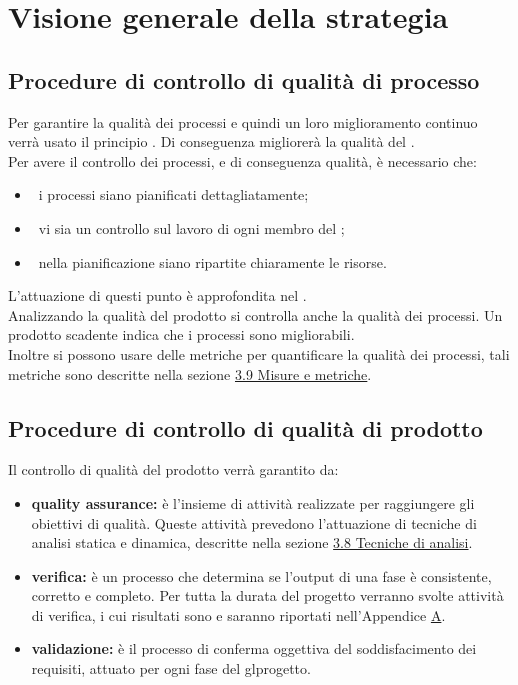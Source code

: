 
\section{Visione generale della strategia}
	\subsection{Procedure di controllo di qualità di processo}
		Per garantire la qualità dei processi e quindi un loro miglioramento continuo verrà usato il principio . Di conseguenza migliorerà la qualità del . \\
		Per avere il controllo dei processi, e di conseguenza qualità, è necessario che:
		\begin{itemize}
			\item\ i processi siano pianificati dettagliatamente;
			\item\ vi sia un controllo sul lavoro di ogni membro del ;
			\item\ nella pianificazione siano ripartite chiaramente le risorse.
		\end{itemize}
		L'attuazione di questi punto è approfondita nel \PPdoc. \\
		Analizzando la qualità del prodotto si controlla anche la qualità dei processi. Un prodotto scadente indica che i processi sono migliorabili. \\
		Inoltre si possono usare delle metriche per quantificare la qualità dei processi, tali metriche sono descritte nella sezione \hyperref[sec:MisureGenerale]{3.9 Misure e metriche}.
	\subsection{Procedure di controllo di qualità di prodotto}
		Il controllo di qualità del prodotto verrà garantito da:
		\begin{itemize}
			\item \textbf{quality assurance:} è l'insieme di attività realizzate per raggiungere gli obiettivi di qualità. Queste attività prevedono l'attuazione di tecniche di analisi statica e dinamica, descritte nella sezione \hyperref[sec:TecnicheAnalisi]{3.8 Tecniche di analisi}.
			\item \textbf{verifica:} è un processo che determina se l'output di una fase è consistente, corretto e completo. Per tutta la durata del progetto verranno svolte attività di verifica, i cui risultati sono e saranno riportati nell'Appendice \hyperref[sec:A]{A}.
			\item \textbf{validazione:} è il processo di conferma oggettiva del soddisfacimento dei requisiti, attuato per ogni fase del gl{progetto}.
		\end{itemize}

